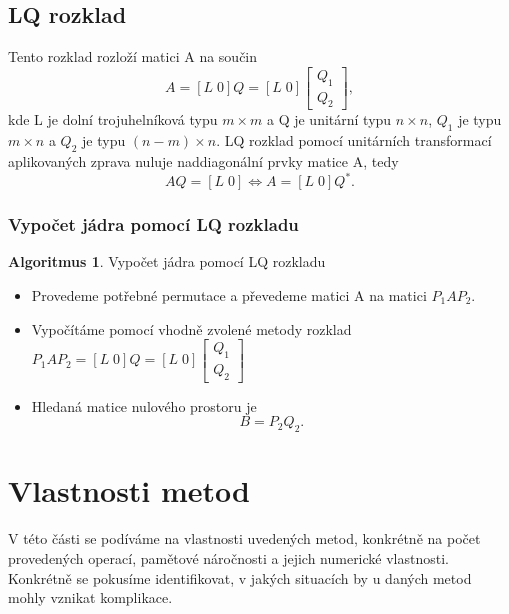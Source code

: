 \documentclass{article}
\theoremstyle{plain}
\theoremstyle{definition}
\newtheorem{algoritmus}{Algoritmus}
\begin{document}
\subsection{LQ rozklad}
Tento rozklad rozloží matici A na součin
\[A = [L\; 0]Q=[L\; 0] \begin{bmatrix}
    Q_1\\
    Q_2
\end{bmatrix},\]
kde L je dolní trojuhelníková typu $m \times m$ a Q je unitární typu $n \times n$, $Q_1$ je typu $m \times n$ a $Q_2$ je typu $(n-m)\times n.$
LQ rozklad pomocí unitárních transformací aplikovaných zprava nuluje naddiagonální prvky matice A, tedy
\[AQ=[L\; 0] \iff A=[L\; 0] Q^*.\]
\subsubsection{Vypočet jádra pomocí LQ rozkladu}
\begin{algoritmus}{Vypočet jádra pomocí LQ rozkladu}
    \begin{itemize}
        Mějme matici A typu $m \times n.$
        \item Provedeme potřebné permutace a převedeme matici A na matici $P_1AP_2.$
        \item Vypočítáme pomocí vhodně zvolené metody rozklad $P_1AP_2=[L\; 0]Q = [L\; 0] \begin{bmatrix}
            Q_1\\
            Q_2
            \end{bmatrix}$
        \item Hledaná matice nulového prostoru je 
        \[B=P_2Q_2.\]
    \end{itemize}
    
\end{algoritmus}


\section{Vlastnosti metod}
V této části se podíváme na vlastnosti uvedených metod, konkrétně na počet provedených operací, pamětové náročnosti a jejich numerické vlastnosti. Konkrétně se pokusíme identifikovat, v jakých situacích by u daných metod mohly vznikat komplikace.
\end{document}
